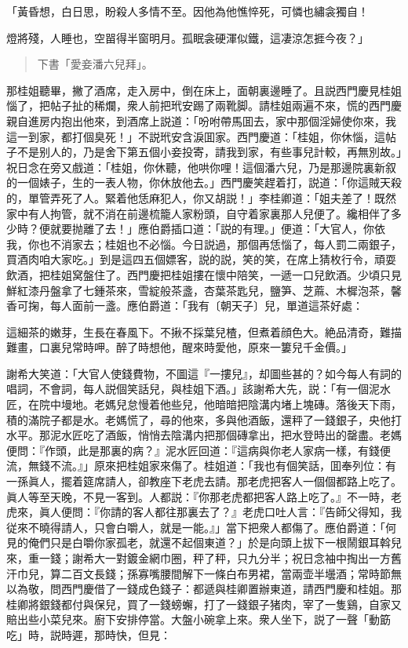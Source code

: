 \begin{myquote}
「黃昏想，白日思，盼殺人多情不至。因他為他憔悴死，可憐也繡衾獨自！

燈將殘，人睡也，空㽞得半窗明月。孤眠衾硬渾似鐵，這凄涼怎捱今夜？」
\end{myquote}

\begin{quotation}
\begin{flushright}
下書「愛妾潘六兒拜」。
\end{flushright}
\end{quotation}

那桂姐聽畢，撇了酒席，走入房中，倒在床上，面朝裏邊睡了。且説西門慶見桂姐惱了，把帖子扯的稀爛，衆人前把玳安踢了兩靴脚。請桂姐兩遍不來，慌的西門慶親自進房内抱出他來，到酒席上説道：「吩咐帶馬囬去，家中那個淫婦使你來，我這一到家，都打個臭死！」不説玳安含淚囬家。西門慶道：「桂姐，你休惱，這帖子不是别人的，乃是舍下第五個小妾投寄，請我到家，有些事兒計較，再無別故。」祝日念在旁又戲道：「桂姐，你休聽，他哄你哩！這個潘六兒，乃是那邊院裏新叙的一個婊子，生的一表人物，你休放他去。」西門慶笑趕着打，説道：「你這賊天殺的，單管弄死了人。緊着他恁麻犯人，你又胡説！」李桂卿道：「姐夫差了！既然家中有人拘管，就不消在前邊梳籠人家粉頭，自守着家裏那人兒便了。纔相伴了多少時？便就要抛離了去！」應伯爵插口道：「説的有理。」便道：「大官人，你依我，你也不消家去；桂姐也不必惱。今日説過，那個再恁惱了，每人罰二兩銀子，買酒肉咱大家吃。」到是這四五個嫖客，説的説，笑的笑，在席上猜枚行令，頑耍飲酒，把桂姐窝盤住了。西門慶把桂姐摟在懷中陪笑，一遞一口兒飲酒。少頃只見鮮紅漆丹盤拿了七鍾茶來，雪綻般茶盞，杏葉茶匙兒，鹽笋、芝蔴、木樨泡茶，馨香可掬，每人面前一盞。應伯爵道：「我有〔朝天子〕兒，單道這茶好處：

\begin{myquote}
這細茶的嫩芽，生長在春風下。不揪不採葉兒楂，但煮着顔色大。絶品清奇，難描難畫，口裏兒常時呷。醉了時想他，醒來時愛他，原來一簍兒千金價。」
\end{myquote}

謝希大笑道：「大官人使錢費物，不圖這『一摟兒』，却圖些甚的？如今每人有詞的唱詞，不會詞，每人説個笑話兒，與桂姐下酒。」該謝希大先，説：「有一個泥水匠，在院中墁地。老媽兒怠慢着他些兒，他暗暗把陰溝内堵上塊磚。落後天下雨，積的滿院子都是水。老媽慌了，尋的他來，多與他酒飯，還秤了一錢銀子，央他打水平。那泥水匠吃了酒飯，悄悄去陰溝内把那個磚拿出，把水登時出的罄盡。老媽便問：『作頭，此是那裏的病？』泥水匠回道：『這病與你老人家病一樣，有錢便流，無錢不流。』」原來把桂姐家來傷了。桂姐道：「我也有個笑話，囬奉列位：有一孫眞人，擺着筵席請人，卻教座下老虎去請。那老虎把客人一個個都路上吃了。眞人等至天晚，不見一客到。人都説：『你那老虎都把客人路上吃了。』不一時，老虎來，眞人便問：『你請的客人都往那裏去了？』老虎口吐人言：『告師父得知，我従來不曉得請人，只會白嚼人，就是一能。』」當下把衆人都傷了。應伯爵道：「何見的俺們只是白嚼你家孤老，就還不起個東道？」於是向頭上拔下一根鬧銀耳斡兒來，重一錢；謝希大一對鍍金網巾圈，秤了秤，只九分半；祝日念袖中掏出一方舊汗巾兒，算二百文長錢；孫寡嘴腰間解下一條白布男裙，當兩壶半壜酒；常時節無以為敬，問西門慶借了一錢成色錢子：都遞與桂卿置辦東道，請西門慶和桂姐。那桂卿將銀錢都付與保兒，買了一錢螃蠏，打了一錢銀子猪肉，宰了一隻鷄，自家又賠出些小菜兒來。廚下安排停當。大盤小碗拿上來。衆人坐下，説了一聲「動筯吃」時，説時遲，那時快，但見：

